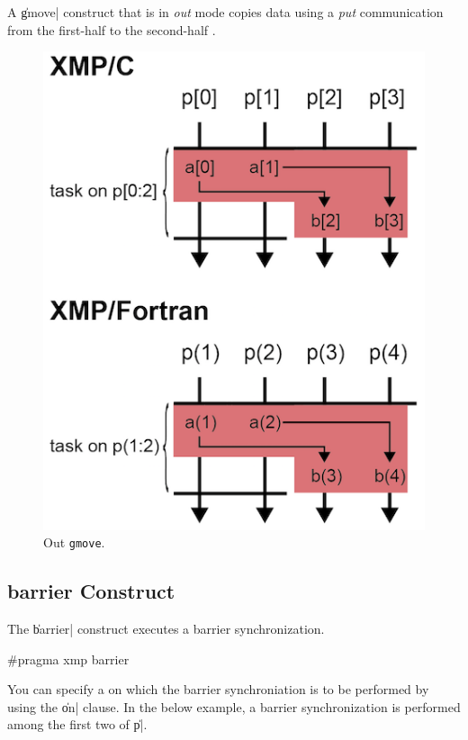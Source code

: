 A \|gmove| construct that is in {\it out} mode copies data using a {\it put}
communication from the first-half {\nodes} to the second-half {\nodes}.

\begin{figure}
  \centering
  \includegraphics{figs/gmove_out.png}
  \caption{Out {\tt gmove}.}
\end{figure}


\subsection{{\bf barrier} Construct}

The \|barrier| construct executes a barrier synchronization.

\begin{XCexample}
#pragma xmp barrier
\end{XCexample}


You can specify a {\nset} on which the barrier synchroniation is to be
performed by using the \|on| clause. In the below example, a barrier
synchronization is performed among the first two {\nodes} of \|p|.

